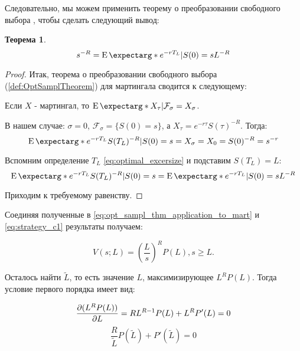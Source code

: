 \documentclass[a4paper,12pt]{article}
\newtheorem{theorem}{Теорема}
\theoremstyle{definition}
\newcommand{\expect}{\operatorname{E}\expectarg}
\begin{document}
Следовательно, мы можем применить теорему о преобразовании свободного выбора \cite{bib:Shiryaev}, чтобы сделать следующий вывод:
\begin{theorem}
\begin{equation}\label{eq:opt_sampl_thm_application_to_mart}
s^{-R} = \expect*{e^{-rT_L} | S(0) = s} L^{-R}
\end{equation}
\end{theorem}
\begin{proof}
Итак, теорема о преобразовании свободного выбора (\ref{def:OptSamplTheorem}) для мартингала сводится к следующему:

Если ${X}$ - мартингал, то $\expect*{X_{\tau} | \mathcal{F}_\sigma} = X_\sigma$.

В нашем случае: $\sigma = 0$, $\mathcal{F}_\sigma = \{S(0) = s\}$, а $X_{\tau} = e^{-r\tau} S(\tau)^{-R}$. Тогда:
\begin{equation*}
    \expect*{e^{-rT_L} S(T_L)^{-R} | S(0) = s} = X_\sigma = X_0 = S(0)^{-R} = s^{-r}
\end{equation*}

Вспомним определение $T_L$ \eqref{eq:optimal_excersize} и подставим $S(T_L) = L$:
\begin{equation}\label{eq:second_part_of_opt_sampl_thm_application_to_mart}
     \expect*{e^{-rT_L} S(T_L)^{-R} | S(0) = s} = \expect*{e^{-rT_L} | S(0) = s} L^{-R}
\end{equation}

Приходим к требуемому равенству.
\end{proof}

Соединяя полученные в \eqref{eq:opt_sampl_thm_application_to_mart} и \eqref{eq:strategy_c1} результаты получаем:

\begin{equation}\label{eq:strategy_c1_simplified}
V(s; L) = \left(\frac{L}{s}\right)^{R} P(L), s \ge L.
\end{equation}

Осталось найти $\widetilde{L}$, то есть значение $L$, максимизирующее $L^{R} P(L)$. Тогда условие первого порядка имеет вид:

\begin{equation*}
    \pdv{(L^{R} P(L))}{L} = R L^{R - 1} P(L) + L^R P'(L) = 0
\end{equation*}
\begin{equation}\label{eq:first_order_rule_m1}
    \frac{R}{\widetilde{L}} P(\widetilde{L}) + P'(\widetilde{L}) = 0
\end{equation}
\end{document}

